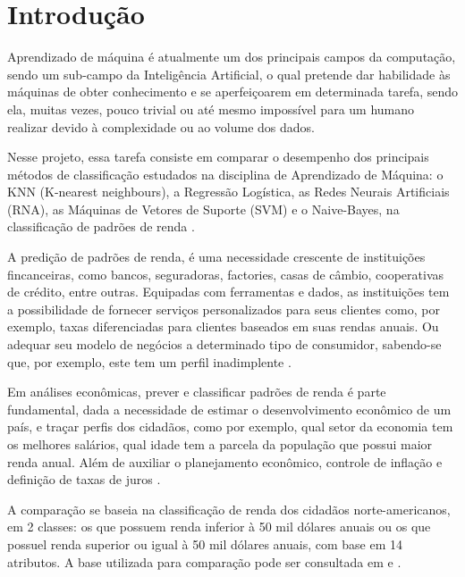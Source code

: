 \section{Introdução}
Aprendizado de máquina é atualmente um dos principais campos da computação, sendo um sub-campo da Inteligência Artificial, o qual pretende dar habilidade às máquinas de obter conhecimento e se aperfeiçoarem em determinada tarefa, sendo ela, muitas vezes, pouco trivial ou até mesmo impossível para um humano realizar devido à complexidade ou ao volume dos dados.

Nesse projeto, essa tarefa consiste em comparar o desempenho dos principais métodos de classificação estudados na disciplina de Aprendizado de Máquina: o KNN (K-nearest neighbours), a Regressão Logística, as Redes Neurais Artificiais (RNA), as Máquinas de Vetores de Suporte (SVM) e o Naive-Bayes, na classificação de padrões de renda \cite{trabalho}.

A predição de padrões de renda, é uma necessidade crescente de instituições fincanceiras, como bancos, seguradoras, factories, casas de câmbio, cooperativas de crédito, entre outras. Equipadas com ferramentas e dados, as instituições tem a possibilidade de fornecer serviços personalizados para seus clientes como, por exemplo, taxas diferenciadas para clientes baseados em suas rendas anuais. Ou adequar seu modelo de negócios a determinado tipo de consumidor, sabendo-se que, por exemplo, este tem um perfil inadimplente \cite{importance}.

Em análises econômicas, prever e classificar padrões de renda é parte fundamental, dada a necessidade de estimar o desenvolvimento econômico de um país, e traçar perfis dos cidadãos, como por exemplo, qual setor da economia tem os melhores salários, qual idade tem a parcela da população que possui maior renda anual. Além de auxiliar o planejamento econômico, controle de inflação e definição de taxas de juros \cite{importance2}.

A comparação se baseia na classificação de renda dos cidadãos norte-americanos, em 2 classes: os que possuem renda inferior à 50 mil dólares anuais ou os que possuel renda superior ou igual à 50 mil dólares anuais, com base em 14 atributos. A base utilizada para comparação pode ser consultada em \cite{base} e \cite{base2}.